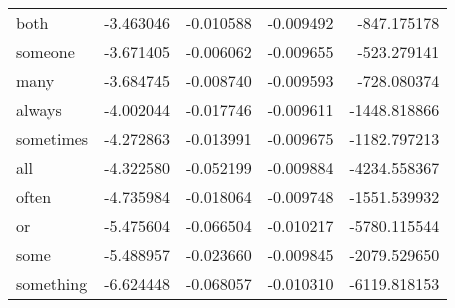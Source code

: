 \begin{table}[ht]
\begin{tabular}{lrrrr}
both & {\cellcolor[HTML]{87BEDA}} \color[HTML]{000000} -3.463046 & {\cellcolor[HTML]{2C75B4}} \color[HTML]{F1F1F1} -0.010588 & {\cellcolor[HTML]{0E4179}} \color[HTML]{F1F1F1} -0.009492 & {\cellcolor[HTML]{2C75B4}} \color[HTML]{F1F1F1} -847.175178 \\
someone & {\cellcolor[HTML]{78B4D5}} \color[HTML]{000000} -3.671405 & {\cellcolor[HTML]{307AB6}} \color[HTML]{F1F1F1} -0.006062 & {\cellcolor[HTML]{0C3D73}} \color[HTML]{F1F1F1} -0.009655 & {\cellcolor[HTML]{2F79B5}} \color[HTML]{F1F1F1} -523.279141 \\
many & {\cellcolor[HTML]{78B4D5}} \color[HTML]{000000} -3.684745 & {\cellcolor[HTML]{2F79B5}} \color[HTML]{F1F1F1} -0.008740 & {\cellcolor[HTML]{0D3F76}} \color[HTML]{F1F1F1} -0.009593 & {\cellcolor[HTML]{2E77B5}} \color[HTML]{F1F1F1} -728.080374 \\
always & {\cellcolor[HTML]{62A7CE}} \color[HTML]{F1F1F1} -4.002044 & {\cellcolor[HTML]{276EB0}} \color[HTML]{F1F1F1} -0.017746 & {\cellcolor[HTML]{0D3F76}} \color[HTML]{F1F1F1} -0.009611 & {\cellcolor[HTML]{276EB0}} \color[HTML]{F1F1F1} -1448.818866 \\
sometimes & {\cellcolor[HTML]{4C99C6}} \color[HTML]{F1F1F1} -4.272863 & {\cellcolor[HTML]{2A71B2}} \color[HTML]{F1F1F1} -0.013991 & {\cellcolor[HTML]{0C3D73}} \color[HTML]{F1F1F1} -0.009675 & {\cellcolor[HTML]{2A71B2}} \color[HTML]{F1F1F1} -1182.797213 \\
all & {\cellcolor[HTML]{4997C5}} \color[HTML]{F1F1F1} -4.322580 & {\cellcolor[HTML]{0F437B}} \color[HTML]{F1F1F1} -0.052199 & {\cellcolor[HTML]{09386D}} \color[HTML]{F1F1F1} -0.009884 & {\cellcolor[HTML]{124984}} \color[HTML]{F1F1F1} -4234.558367 \\
often & {\cellcolor[HTML]{3885BC}} \color[HTML]{F1F1F1} -4.735984 & {\cellcolor[HTML]{276EB0}} \color[HTML]{F1F1F1} -0.018064 & {\cellcolor[HTML]{0A3B70}} \color[HTML]{F1F1F1} -0.009748 & {\cellcolor[HTML]{276EB0}} \color[HTML]{F1F1F1} -1551.539932 \\
or & {\cellcolor[HTML]{2267AC}} \color[HTML]{F1F1F1} -5.475604 & {\cellcolor[HTML]{053061}} \color[HTML]{F1F1F1} -0.066504 & {\cellcolor[HTML]{053061}} \color[HTML]{F1F1F1} -0.010217 & {\cellcolor[HTML]{073467}} \color[HTML]{F1F1F1} -5780.115544 \\
some & {\cellcolor[HTML]{2267AC}} \color[HTML]{F1F1F1} -5.488957 & {\cellcolor[HTML]{2267AC}} \color[HTML]{F1F1F1} -0.023660 & {\cellcolor[HTML]{09386D}} \color[HTML]{F1F1F1} -0.009845 & {\cellcolor[HTML]{2267AC}} \color[HTML]{F1F1F1} -2079.529650 \\
something & {\cellcolor[HTML]{053061}} \color[HTML]{F1F1F1} -6.624448 & {\cellcolor[HTML]{053061}} \color[HTML]{F1F1F1} -0.068057 & {\cellcolor[HTML]{053061}} \color[HTML]{F1F1F1} -0.010310 & {\cellcolor[HTML]{053061}} \color[HTML]{F1F1F1} -6119.818153 \\
\bottomrule
\end{tabular}
\end{table}
